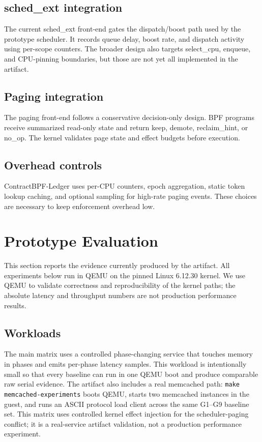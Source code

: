 \documentclass[letterpaper,twocolumn,10pt]{article}
\newcommand{\sys}{ContractBPF-Ledger\xspace}
\begin{document}
\subsection{sched\_ext integration}

The current sched\_ext front-end gates the dispatch/boost path used by the
prototype scheduler. It records queue delay, boost rate, and dispatch activity
using per-scope counters. The broader design also targets select\_cpu, enqueue,
and CPU-pinning boundaries, but those are not yet all implemented in the
artifact.

\subsection{Paging integration}

The paging front-end follows a conservative decision-only design. BPF programs receive summarized read-only state and return keep, demote, reclaim\_hint, or no\_op. The kernel validates page state and effect budgets before execution.

\subsection{Overhead controls}

\sys uses per-CPU counters, epoch aggregation, static token lookup caching, and optional sampling for high-rate paging events. These choices are necessary to keep enforcement overhead low.

\section{Prototype Evaluation}

This section reports the evidence currently produced by the artifact. All
experiments below run in QEMU on the pinned Linux 6.12.30 kernel. We use QEMU to
validate correctness and reproducibility of the kernel paths; the absolute
latency and throughput numbers are not production performance results.

\subsection{Workloads}

The main matrix uses a controlled phase-changing service that touches memory in
phases and emits per-phase latency samples. This workload is intentionally small
so that every baseline can run in one QEMU boot and produce comparable raw
serial evidence. The artifact also includes a real memcached path:
\texttt{make memcached-experiments} boots QEMU, starts two memcached instances
in the guest, and runs an ASCII protocol load client across the same G1--G9
baseline set. This matrix uses controlled kernel effect injection for the
scheduler-paging conflict; it is a real-service artifact validation, not a
production performance experiment.
\end{document}

